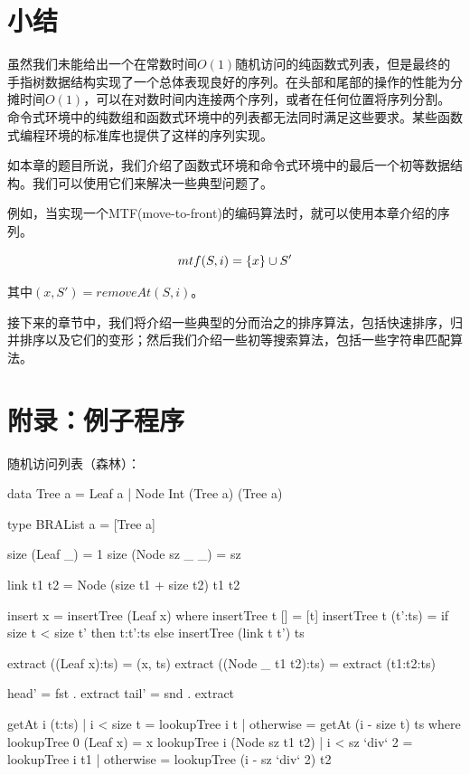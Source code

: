 \documentclass[b5paper]{ctexart}
\begin{document}
\section{小结}

虽然我们未能给出一个在常数时间$O(1)$随机访问的纯函数式列表，但是最终的手指树数据结构实现了一个总体表现良好的序列。在头部和尾部的操作的性能为分摊时间$O(1)$，可以在对数时间内连接两个序列，或者在任何位置将序列分割。命令式环境中的纯数组和函数式环境中的列表都无法同时满足这些要求。某些函数式编程环境的标准库也提供了这样的序列实现\cite{hackage-ftr}。

如本章的题目所说，我们介绍了函数式环境和命令式环境中的最后一个初等数据结构。我们可以使用它们来解决一些典型问题了。

例如，当实现一个MTF(move-to-front)的编码算法时\cite{mtf-wiki}，就可以使用本章介绍的序列。

\[
mtf(S, i) = \{x\} \cup S' \\
\]

其中$(x, S') = removeAt(S, i)$。

接下来的章节中，我们将介绍一些典型的分而治之的排序算法，包括快速排序，归并排序以及它们的变形；然后我们介绍一些初等搜索算法，包括一些字符串匹配算法。


\section{附录：例子程序}

随机访问列表（森林）：

\lstset{frame = single}
\begin{Haskell}
data Tree a = Leaf a
            | Node Int (Tree a) (Tree a)

type BRAList a = [Tree a]

size (Leaf _) = 1
size (Node sz _ _) = sz

link t1 t2 = Node (size t1 + size t2) t1 t2

insert x = insertTree (Leaf x) where
    insertTree t [] = [t]
    insertTree t (t':ts) = if size t < size t' then  t:t':ts
                           else insertTree (link t t') ts

extract ((Leaf x):ts) = (x, ts)
extract ((Node _ t1 t2):ts) = extract (t1:t2:ts)

head' = fst . extract
tail' = snd . extract

getAt i (t:ts) | i < size t = lookupTree i t
               | otherwise = getAt (i - size t) ts
  where
    lookupTree 0 (Leaf x) = x
    lookupTree i (Node sz t1 t2)
        | i < sz `div` 2 = lookupTree i t1
        | otherwise = lookupTree (i - sz `div` 2) t2
\end{Haskell}
\end{document}
